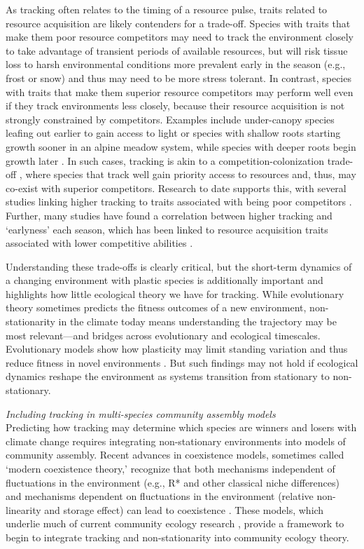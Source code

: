 \documentclass[11pt,letterpaper]{article}
\newcommand{\R}[1]{\label{}\linelabel{#1}} %
\begin{document}
As tracking often relates to the timing of a resource pulse, traits related to resource acquisition are likely contenders for a trade-off. Species with traits that make them poor resource competitors may need to track the environment closely to take advantage of transient periods of available resources, but will risk tissue loss to harsh environmental conditions more prevalent early in the season (e.g., frost or snow) and thus may need to be more stress tolerant.\R{r1stress} In contrast, species with traits that make them superior resource competitors may perform well even if they track environments less closely, because their resource acquisition is not strongly constrained by competitors. Examples include under-canopy species leafing out earlier to gain access to light \citep{heberling2019} or species with shallow roots starting growth sooner in an alpine meadow system, while species with deeper roots begin growth later \citep{Zhu2016BioLetters}. In such cases, tracking is akin to a competition-colonization trade-off \citep{Amarasekare:2003tq}, where species that track well gain priority access to resources and, thus, may co-exist with superior competitors. Research to date supports this, with several studies linking higher tracking to traits associated with being poor competitors \citep{Dorji2013,lasky2016,Zhu2016BioLetters}. Further, many studies have found a correlation between higher tracking and `earlyness' each season, which has been linked to resource acquisition traits associated with lower competitive abilities \citep[][see Box `Trait trade-offs with tracking']{wolkovich2014aob}.  

Understanding these trade-offs is clearly critical, but the short-term dynamics of a changing environment with plastic species is additionally important and highlights how little ecological theory we have for tracking. While evolutionary theory sometimes predicts the fitness outcomes of a new environment, non-stationarity in the climate today means understanding the trajectory may be most relevant---and bridges across evolutionary and ecological timescales. Evolutionary models show how plasticity may limit standing variation and thus reduce fitness in novel environments \citep{Ghalambor2007,fournier2016,fox2019}. But such findings may not hold if ecological dynamics reshape the environment as systems transition from stationary to non-stationary. 

\emph{Including tracking in multi-species community assembly models} \\
Predicting how tracking may determine which species are winners and losers with climate change requires integrating non-stationary environments into models of community assembly. Recent advances in coexistence models, sometimes called `modern coexistence theory,' recognize that both mechanisms independent of fluctuations in the environment (e.g., R* and other classical niche differences) and mechanisms dependent on fluctuations in the environment (relative non-linearity and storage effect) can lead to coexistence \citep{Chesson:1997dz,Chesson:2000vd}. These models, which underlie much of current community ecology research \citep{Mayfield:2010fe,barabas2018,ellner2019}, provide a framework to begin to integrate tracking and non-stationarity into community ecology theory.
\end{document}
